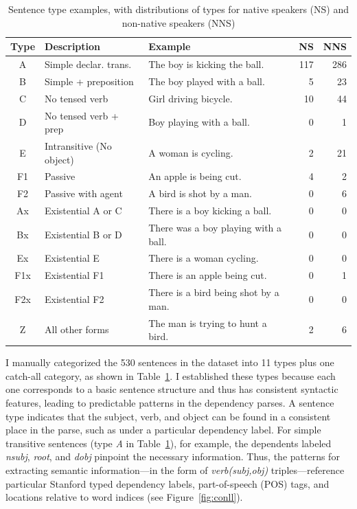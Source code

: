 \begin{table}[htb!]
\begin{center}
\begin{tabular}{|c|l|l|r|r|}
\hline
Type & Description & Example & NS & NNS \\
\hline
 A & Simple declar. trans. & The boy is kicking the ball. & 117 & 286 \\
 \hline
 B & Simple + preposition & The boy played with a ball. & 5 & 23 \\
 \hline
 C & No tensed verb & Girl driving bicycle. & 10 & 44 \\
 \hline
 D & No tensed verb + prep & Boy playing with a ball. & 0 & 1 \\
 \hline
 E & Intransitive (No object) & A woman is cycling. & 2 & 21 \\
 \hline
 F1 & Passive & An apple is being cut. & 4 & 2 \\
 \hline
 F2 & Passive with agent & A bird is shot by a man. & 0 & 6 \\
 \hline
 Ax & Existential A or C & There is a boy kicking a ball. & 0 & 0 \\
 \hline
 Bx & Existential B  or D & There was a boy playing with a ball. & 0 & 0 \\
 \hline
 Ex & Existential E & There is a woman cycling. & 0 & 0 \\
 \hline
 F1x & Existential F1 & There is an apple being cut. & 0 & 1 \\
 \hline
 F2x & Existential F2 & There is a bird being shot by a man. & 0 & 0 \\
 \hline
 Z & All other forms & The man is trying to hunt a bird. & 2 & 6 \\
 \hline
\end{tabular}
\end{center}
\caption{Sentence type examples, with distributions of types for
  native speakers (NS) and non-native speakers (NNS)}
\label{tab:sentence-type}
\end{table}


I manually categorized the 530 sentences in the dataset into 11 types plus one catch-all category, as shown in
Table~\ref{tab:sentence-type}. I established these types because each
one corresponds to a basic sentence structure and thus has consistent
syntactic features, leading to predictable patterns in the dependency
parses. A sentence type indicates that the subject,
verb, and object can be found in a consistent place in the parse,
such as under a particular dependency label.
For simple transitive sentences (type \textit{A} in Table~\ref{tab:sentence-type}), for example, the dependents labeled \textit{nsubj}, \textit{root}, and \textit{dobj} 
pinpoint the necessary information.
Thus, the patterns for extracting semantic information---in the form
of \textit{verb(subj,obj)} triples---reference particular Stanford
typed dependency labels, part-of-speech (POS) tags, and locations
relative to word indices (see Figure~\ref{fig:conll}).


